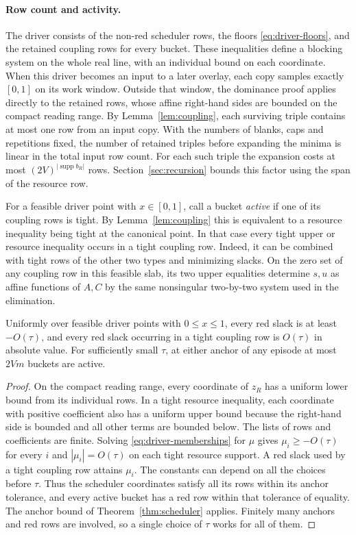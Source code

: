 \paragraph{Row count and activity.}
The driver consists of the non-red scheduler rows, the floors
\eqref{eq:driver-floors}, and the retained coupling rows for every bucket.
These inequalities define a blocking system on the whole real line,
with an individual bound on each coordinate. When this driver becomes an
input to a later overlay, each copy samples exactly $[0,1]$ on its work
window. Outside that window, the dominance proof applies directly to the
retained rows, whose affine right-hand sides are bounded on the compact
reading range. By Lemma~\ref{lem:coupling}, each surviving triple contains at most one
row from an input copy. With the numbers of blanks, caps and repetitions fixed, the number
of retained triples before expanding the minima is linear in the total
input row count. For each such triple the expansion costs at most
\((2V)^{|\operatorname{supp}b_R|}\) rows. Section~\ref{sec:recursion}
bounds this factor using the span of the resource row.

For a feasible driver point with $x\in[0,1]$, call a bucket
\emph{active} if one of its coupling rows is tight. By Lemma~\ref{lem:coupling} this is equivalent to a resource
inequality being tight at the canonical point. In that case every tight
upper or resource inequality occurs in a tight coupling row. Indeed, it
can be combined with tight rows of the other two types and minimizing slacks.
On the zero set of any coupling row in this feasible slab, its two upper
equalities determine $s,u$ as affine functions of
$A,C$ by the same nonsingular two-by-two system used in the elimination.

\begin{lemma}\label{lem:active}
Uniformly over feasible driver points with $0\le x\le1$, every red slack
is at least $-O(\tau)$, and every red slack occurring in a tight coupling
row is $O(\tau)$ in absolute value. For sufficiently small $\tau$, at
either anchor of any episode at most $2Vm$ buckets are active.
\end{lemma}

\begin{proof}
On the compact reading range, every coordinate of $z_R$ has a uniform
lower bound from its individual rows. In a tight resource inequality,
each coordinate with positive coefficient also has a uniform upper bound
because the right-hand side is bounded and all other terms are bounded below.
The lists of rows and coefficients are finite. Solving
\eqref{eq:driver-memberships} for $\mu$ gives $\mu_i\ge-O(\tau)$ for
every $i$ and $|\mu_i|=O(\tau)$ on each tight resource support. A red
slack used by a tight coupling row attains $\mu_i$. The constants can
depend on all the choices before $\tau$. Thus the scheduler coordinates
satisfy all its rows within its anchor tolerance, and every active
bucket has a red row within that tolerance of equality. The anchor
bound of Theorem~\ref{thm:scheduler} applies. Finitely many anchors and
red rows are involved, so a single choice of \(\tau\) works for all
of them.
\end{proof}
